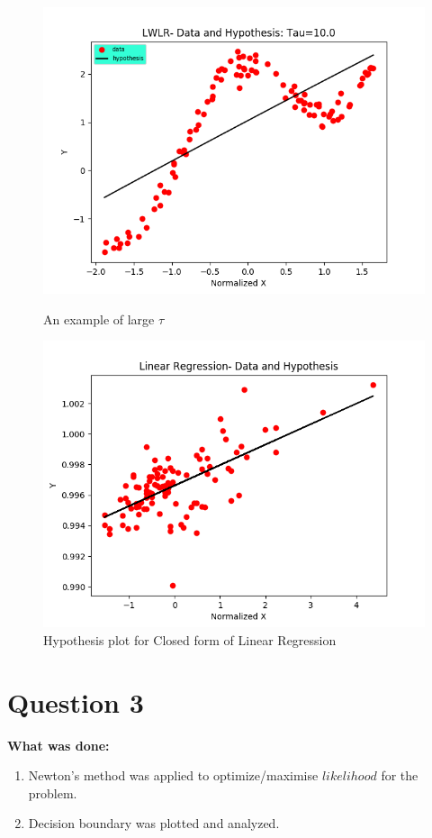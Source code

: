 \documentclass{article}
\newcommand{\bld}[1]{\textbf{#1}}
\begin{document}
\begin{figure}
\vspace*{-2cm}
\centering
\includegraphics[scale=0.9]{LWLR_under.png}
\caption{An example of large $\tau$}
\includegraphics[scale=0.9]{AnalyticHypothesis.png}
\caption{Hypothesis plot for Closed form of Linear Regression}
\end{figure}


\section*{Question 3}
\bld{What was done:}
\begin{enumerate}
\item Newton's method was applied to optimize/maximise $likelihood$ for the problem.
\item Decision boundary was plotted and analyzed.
\end{enumerate}  
\end{document}
